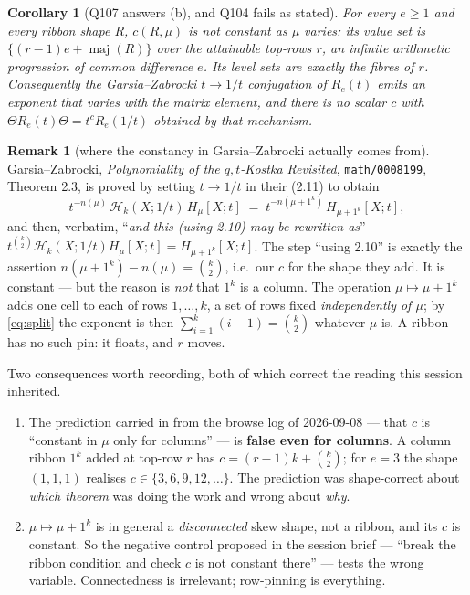 \documentclass[11pt]{article}
\newtheorem{corollary}[theorem]{Corollary}
\theoremstyle{definition}
\newtheorem{remark}[theorem]{Remark}
\DeclareMathOperator{\maj}{maj}
\begin{document}
\begin{corollary}[Q107 answers \textup{(b)}, and Q104 fails as stated]\label{cor:notconst}
For every $e\ge1$ and every ribbon shape $R$, $c(R,\mu)$ is \emph{not} constant as
$\mu$ varies: its value set is $\{(r-1)e+\maj(R)\}$ over the attainable top-rows $r$,
an infinite arithmetic progression of common difference $e$.  Its level sets are
exactly the fibres of $r$.  Consequently the Garsia--Zabrocki $t\to1/t$ conjugation
of $R_e(t)$ emits an exponent that varies with the matrix element, and there is no
scalar $c$ with $\Theta R_e(t)\Theta=t^{c}R_e(1/t)$ obtained by that mechanism.
\end{corollary}

\begin{remark}[where the constancy in Garsia--Zabrocki actually comes from]
\label{rem:gz}
Garsia--Zabrocki, \emph{Polynomiality of the $q,t$-Kostka Revisited},
\href{https://arxiv.org/abs/math/0008199}{\texttt{math/0008199}}, Theorem 2.3, is
proved by setting $t\to1/t$ in their (2.11) to obtain
\[
  t^{-n(\mu)}\,\mathcal H_k(X;1/t)\,H_\mu[X;t]
  \;=\;t^{-n(\mu+1^k)}\,H_{\mu+1^k}[X;t],
\]
and then, verbatim, ``\emph{and this (using 2.10) may be rewritten as}''
$t^{\binom k2}\mathcal H_k(X;1/t)H_\mu[X;t]=H_{\mu+1^k}[X;t]$.  The step
``using 2.10'' is exactly the assertion $n(\mu+1^k)-n(\mu)=\binom k2$, i.e.\ our
$c$ for the shape they add.  It is constant --- but the reason is \emph{not} that
$1^k$ is a column.  The operation $\mu\mapsto\mu+1^k$ adds one cell to each of rows
$1,\dots,k$, a set of rows fixed \emph{independently of $\mu$}; by \eqref{eq:split}
the exponent is then $\sum_{i=1}^k(i-1)=\binom k2$ whatever $\mu$ is.  A ribbon has
no such pin: it floats, and $r$ moves.

Two consequences worth recording, both of which correct the reading this session
inherited.
\begin{enumerate}
\item[(i)] The prediction carried in from the browse log of 2026-09-08 --- that $c$
is ``constant in $\mu$ only for columns'' --- is \textbf{false even for columns}.  A
column ribbon $1^k$ added at top-row $r$ has $c=(r-1)k+\binom k2$; for $e=3$ the
shape $(1,1,1)$ realises $c\in\{3,6,9,12,\dots\}$.  The prediction was shape-correct
about \emph{which theorem} was doing the work and wrong about \emph{why}.
\item[(ii)] $\mu\mapsto\mu+1^k$ is in general a \emph{disconnected} skew shape, not a
ribbon, and its $c$ is constant.  So the negative control proposed in the session
brief --- ``break the ribbon condition and check $c$ is not constant there'' ---
tests the wrong variable.  Connectedness is irrelevant; row-pinning is everything.
\end{enumerate}
\end{remark}
\end{document}
